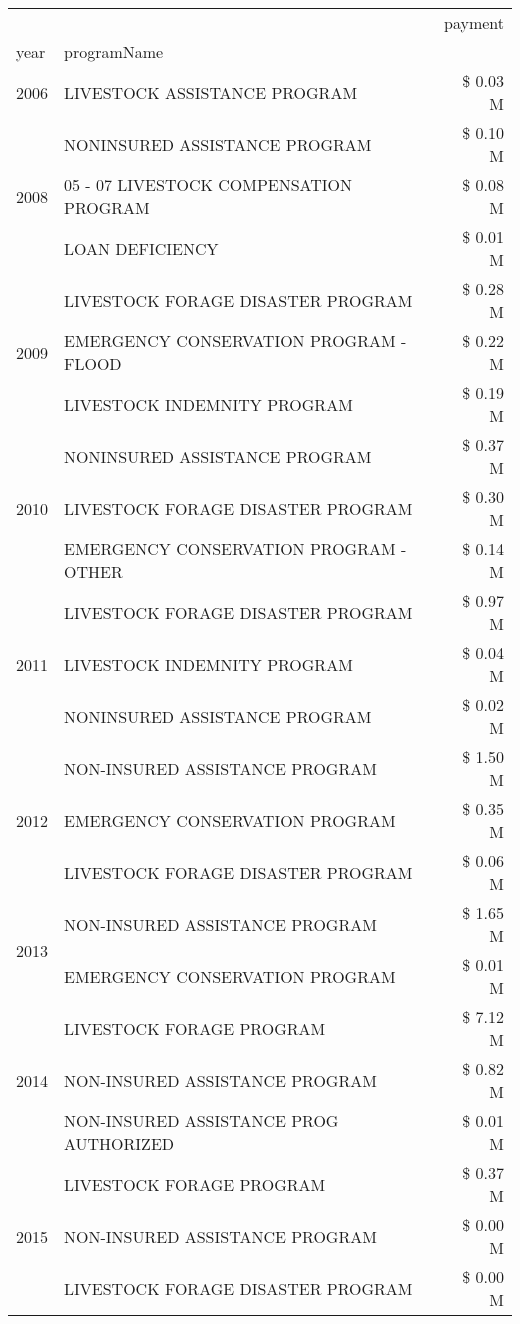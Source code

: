 \begin{tabular}{llr}
\toprule
 &  & payment \\
year & programName &  \\
\midrule
2006 & LIVESTOCK ASSISTANCE PROGRAM & \$ 0.03 M \\
\cline{1-3}
\multirow[t]{3}{*}{2008} & NONINSURED ASSISTANCE PROGRAM & \$ 0.10 M \\
 & 05 - 07 LIVESTOCK COMPENSATION PROGRAM & \$ 0.08 M \\
 & LOAN DEFICIENCY & \$ 0.01 M \\
\cline{1-3}
\multirow[t]{3}{*}{2009} & LIVESTOCK FORAGE DISASTER  PROGRAM & \$ 0.28 M \\
 & EMERGENCY CONSERVATION PROGRAM - FLOOD & \$ 0.22 M \\
 & LIVESTOCK INDEMNITY PROGRAM & \$ 0.19 M \\
\cline{1-3}
\multirow[t]{3}{*}{2010} & NONINSURED ASSISTANCE PROGRAM & \$ 0.37 M \\
 & LIVESTOCK FORAGE DISASTER  PROGRAM & \$ 0.30 M \\
 & EMERGENCY CONSERVATION PROGRAM - OTHER & \$ 0.14 M \\
\cline{1-3}
\multirow[t]{3}{*}{2011} & LIVESTOCK FORAGE DISASTER PROGRAM & \$ 0.97 M \\
 & LIVESTOCK INDEMNITY PROGRAM & \$ 0.04 M \\
 & NONINSURED ASSISTANCE PROGRAM & \$ 0.02 M \\
\cline{1-3}
\multirow[t]{3}{*}{2012} & NON-INSURED ASSISTANCE PROGRAM & \$ 1.50 M \\
 & EMERGENCY CONSERVATION PROGRAM & \$ 0.35 M \\
 & LIVESTOCK FORAGE DISASTER PROGRAM & \$ 0.06 M \\
\cline{1-3}
\multirow[t]{2}{*}{2013} & NON-INSURED ASSISTANCE PROGRAM & \$ 1.65 M \\
 & EMERGENCY CONSERVATION PROGRAM & \$ 0.01 M \\
\cline{1-3}
\multirow[t]{3}{*}{2014} & LIVESTOCK FORAGE PROGRAM & \$ 7.12 M \\
 & NON-INSURED ASSISTANCE PROGRAM & \$ 0.82 M \\
 & NON-INSURED ASSISTANCE PROG AUTHORIZED & \$ 0.01 M \\
\cline{1-3}
\multirow[t]{3}{*}{2015} & LIVESTOCK FORAGE PROGRAM & \$ 0.37 M \\
 & NON-INSURED ASSISTANCE PROGRAM & \$ 0.00 M \\
 & LIVESTOCK FORAGE DISASTER PROGRAM & \$ 0.00 M \\

\end{tabular}

